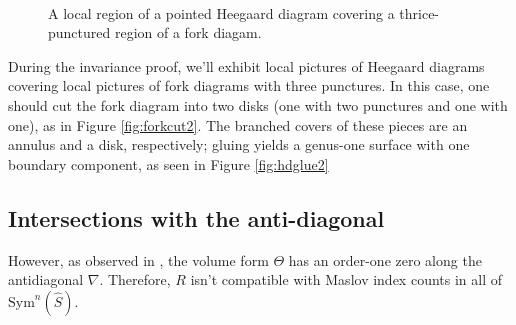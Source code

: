\documentclass[11pt]{article}
\theoremstyle{plain} \newtheorem{thm}{Theorem}[subsection]
\theoremstyle{plain} \newtheorem{cor}[thm]{Corollary}
\theoremstyle{plain} \newtheorem{prop}[thm]{Proposition}
\theoremstyle{plain} \newtheorem{conj}[thm]{Conjecture}
\theoremstyle{plain} \newtheorem{lem}[thm]{Lemma}
\theoremstyle{definition} \newtheorem{df}[thm]{Definition}
\theoremstyle{remark} \newtheorem{rmk}[thm]{Remark}
\theoremstyle{remark} \newtheorem{obs}[thm]{Observation}
\newcommand{\bx}{\mathbf{x}}
\newcommand{\by}{\mathbf{y}}
\newcommand{\AD}{\nabla}
\begin{document}
\begin{figure}[h!]
\centering
{} \quad
{}\\
\caption[Producing a Heegaard diagram]{A local region of a pointed Heegaard diagram covering a thrice-punctured region of a fork diagam.}
\end{figure}

During the invariance proof, we'll exhibit local pictures of Heegaard diagrams covering local pictures of fork diagrams with three punctures.  In this case, one should cut the fork diagram into two disks (one with two punctures and one with one), as in Figure \ref{fig:forkcut2}.   The branched covers of these pieces are an annulus and a disk, respectively; gluing yields a genus-one surface with one boundary component, as seen in Figure \ref{fig:hdglue2}

\subsection{Intersections with the anti-diagonal}

However, as observed in \cite{ss:R2}, the volume form $\Theta$ has an order-one zero along the antidiagonal $\AD$.  Therefore, $R$ isn't compatible with Maslov index counts in all of $\text{Sym}^{n}(\widehat{S})$.  
%
\end{document}
